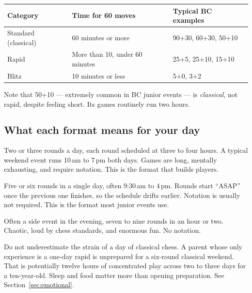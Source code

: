 \documentclass[10pt,letterpaper]{article}
\begin{document}
\begin{center}
\begin{tabular}{@{}lll@{}}
\toprule
\textbf{Category} & \textbf{Time for 60 moves} & \textbf{Typical BC examples} \\
\midrule
Standard (classical) & 60 minutes or more & 90+30, 60+30, 50+10 \\
Rapid & More than 10, under 60 minutes & 25+5, 25+10, 15+10 \\
Blitz & 10 minutes or less & 5+0, 3+2 \\
\bottomrule
\end{tabular}
\end{center}

Note that 50+10 --- extremely common in BC junior events --- is
\emph{classical}, not rapid, despite feeling short. Its games routinely run two
hours.

\subsection{What each format means for your day}

\begin{description}[leftmargin=0pt,style=nextline,itemsep=6pt]
  \item[Classical] Two or three rounds a day, each round scheduled at
        three to four hours. A typical weekend event runs 10\,am to 7\,pm both days.
        Games are long, mentally exhausting, and require notation. This is the
        format that builds players.
  \item[Rapid] Five or six rounds in a single day, often 9:30\,am to 4\,pm.
        Rounds start ``ASAP'' once the previous one finishes, so the schedule
        drifts earlier. Notation is usually not required. This is the format
        most junior events use.
  \item[Blitz] Often a side event in the evening, seven to nine rounds in an
        hour or two. Chaotic, loud by chess standards, and enormous fun. No
        notation.
\end{description}

\begin{keybox}{Do not underestimate the strain of a day of classical chess.}
A parent whose only experience is a one-day rapid is unprepared for a
six-round classical weekend. That is potentially twelve hours of concentrated
play across two to three days for a ten-year-old. Sleep and food matter more than
opening preparation. See Section~\ref{sec:emotional}.
\end{keybox}
\end{document}
